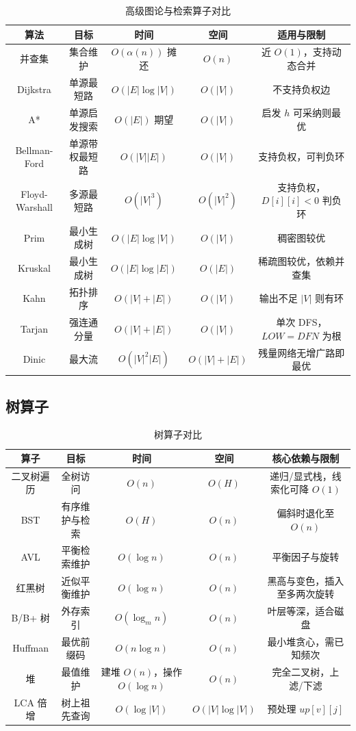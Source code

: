 \begin{table}[H]
\centering
\footnotesize
\renewcommand{\arraystretch}{1.3}
\begin{tabulary}{\textwidth}{@{}CCCCC@{}}
\toprule
\textbf{算法} & \textbf{目标} & \textbf{时间} & \textbf{空间} & \textbf{适用与限制} \\
\midrule
并查集 & 集合维护 & $O(\alpha(n))$ 摊还 & $O(n)$ & 近 $O(1)$，支持动态合并 \\
Dijkstra & 单源最短路 & $O(|E|\log|V|)$ & $O(|V|)$ & 不支持负权边 \\
A* & 单源启发搜索 & $O(|E|)$ 期望 & $O(|V|)$ & 启发 $h$ 可采纳则最优 \\
Bellman-Ford & 单源带权最短路 & $O(|V||E|)$ & $O(|V|)$ & 支持负权，可判负环 \\
Floyd-Warshall & 多源最短路 & $O(|V|^3)$ & $O(|V|^2)$ & 支持负权，$D[i][i]<0$ 判负环 \\
Prim & 最小生成树 & $O(|E|\log|V|)$ & $O(|V|)$ & 稠密图较优 \\
Kruskal & 最小生成树 & $O(|E|\log|E|)$ & $O(|E|)$ & 稀疏图较优，依赖并查集 \\
Kahn & 拓扑排序 & $O(|V|+|E|)$ & $O(|V|)$ & 输出不足 $|V|$ 则有环 \\
Tarjan & 强连通分量 & $O(|V|+|E|)$ & $O(|V|)$ & 单次 DFS，$LOW=DFN$ 为根 \\
Dinic & 最大流 & $O(|V|^2|E|)$ & $O(|V|+|E|)$ & 残量网络无增广路即最优 \\
\bottomrule
\end{tabulary}
\caption{高级图论与检索算子对比}
\label{tab:graph_compare}
\end{table}

\subsection{树算子}

\begin{table}[H]
\centering
\footnotesize
\renewcommand{\arraystretch}{1.3}
\begin{tabulary}{\textwidth}{@{}CCCCC@{}}
\toprule
\textbf{算子} & \textbf{目标} & \textbf{时间} & \textbf{空间} & \textbf{核心依赖与限制} \\
\midrule
二叉树遍历 & 全树访问 & $O(n)$ & $O(H)$ & 递归/显式栈，线索化可降 $O(1)$ \\
BST & 有序维护与检索 & $O(H)$ & $O(n)$ & 偏斜时退化至 $O(n)$ \\
AVL & 平衡检索维护 & $O(\log n)$ & $O(n)$ & 平衡因子与旋转 \\
红黑树 & 近似平衡维护 & $O(\log n)$ & $O(n)$ & 黑高与变色，插入至多两次旋转 \\
B/B+ 树 & 外存索引 & $O(\log_m n)$ & $O(n)$ & 叶层等深，适合磁盘 \\
Huffman & 最优前缀码 & $O(n\log n)$ & $O(n)$ & 最小堆贪心，需已知频次 \\
堆 & 最值维护 & 建堆 $O(n)$，操作 $O(\log n)$ & $O(n)$ & 完全二叉树，上滤/下滤 \\
LCA 倍增 & 树上祖先查询 & $O(\log|V|)$ & $O(|V|\log|V|)$ & 预处理 $up[v][j]$ \\
\bottomrule
\end{tabulary}
\caption{树算子对比}
\label{tab:tree_compare}
\end{table}

